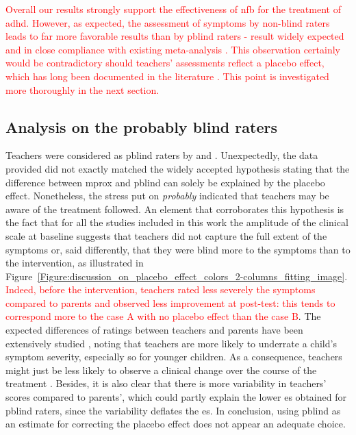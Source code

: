 \textcolor{red}{Overall our results strongly support the effectiveness of \gls{nfb} for the treatment of \gls{adhd}. However, as expected, the assessment of symptoms by non-blind raters 
leads to far more favorable results than by \gls{pblind} raters - result widely expected and in close compliance with existing 
meta-analysis \citep{Cortese2016, Micoulaud2014}. This observation certainly would be contradictory should teachers’ 
assessments reflect a placebo effect, which has long been documented in the literature \citep{Sollie2013, Narad2015, Minder2018}. 
This point is investigated more thoroughly in the next section.}

\subsection{Analysis on the probably blind raters}

Teachers were considered as \gls{pblind} raters by \citeauthor{Cortese2016} and \citeauthor{Micoulaud2014}.
Unexpectedly, the data provided did not exactly matched the widely accepted hypothesis stating that the difference between
\gls{mprox} and \gls{pblind} can solely be explained by the placebo effect. 
Nonetheless, the stress put on \emph{probably} indicated that teachers may be aware of the treatment followed. 
An element that corroborates this hypothesis is the fact that for all the studies included in this work the amplitude 
of the clinical scale at baseline suggests that teachers did not capture the full extent of the symptoms or, said differently, 
that they were blind more to the symptoms than to the intervention, as illustrated 
in Figure~\ref{Figure:discussion_on_placebo_effect_colors_2-columns_fitting_image}. 
\textcolor{red}{Indeed, before the intervention, teachers rated less severely the symptoms compared to parents and observed less improvement at post-test: 
this tends to correspond more to the case A with no placebo effect than the case B}. The expected differences of ratings between 
teachers and parents have been extensively studied \citep{Sollie2013, Narad2015, Minder2018}, noting that teachers are more 
likely to underrate a child's symptom severity, especially so for younger children. As a consequence, teachers might just be less likely 
to observe a clinical change over the course of the treatment \citep{Sollie2013, Narad2015, Minder2018}. Besides, it is also clear 
that there is more variability in teachers' scores compared to parents', which could partly explain the lower \gls{es} obtained for 
\gls{pblind} raters, since the variability deflates the \gls{es}. In conclusion, using \gls{pblind} as an estimate for correcting the 
placebo effect does not appear an adequate choice. 

